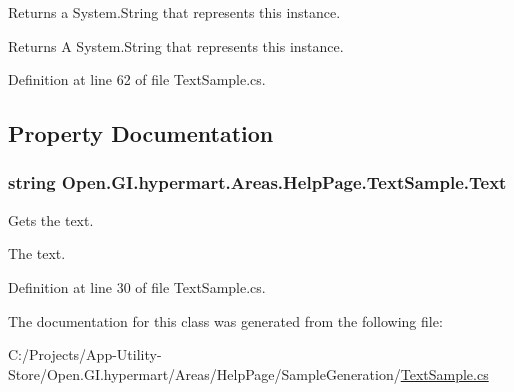 Returns a System.\+String that represents this instance. 

\begin{DoxyReturn}{Returns}
A System.\+String that represents this instance. 
\end{DoxyReturn}


Definition at line 62 of file Text\+Sample.\+cs.



\subsection{Property Documentation}
\hypertarget{class_open_1_1_g_i_1_1hypermart_1_1_areas_1_1_help_page_1_1_text_sample_aac44397744d5ca5d933bc1d85b07eda6}{}
\subsubsection[{Text}]{\setlength{\rightskip}{0pt plus 5cm}string Open.\+G\+I.\+hypermart.\+Areas.\+Help\+Page.\+Text\+Sample.\+Text\hspace{0.3cm}{\ttfamily [get]}}\label{class_open_1_1_g_i_1_1hypermart_1_1_areas_1_1_help_page_1_1_text_sample_aac44397744d5ca5d933bc1d85b07eda6}


Gets the text. 

The text. 

Definition at line 30 of file Text\+Sample.\+cs.



The documentation for this class was generated from the following file\+:\begin{DoxyCompactItemize}
\item 
C\+:/\+Projects/\+App-\/\+Utility-\/\+Store/\+Open.\+G\+I.\+hypermart/\+Areas/\+Help\+Page/\+Sample\+Generation/\hyperlink{_text_sample_8cs}{Text\+Sample.\+cs}\end{DoxyCompactItemize}
